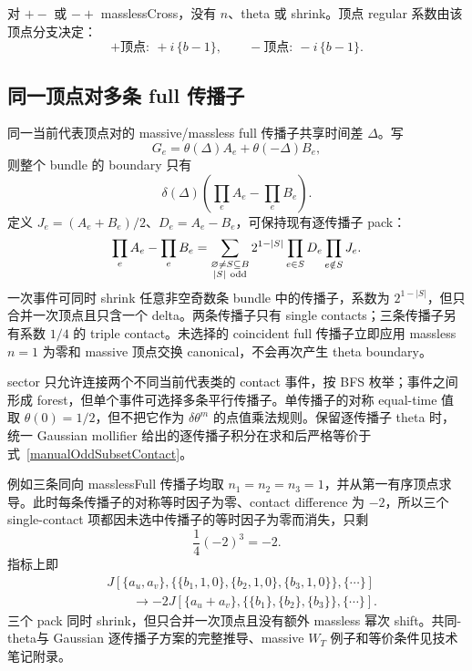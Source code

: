 ﻿\documentclass[a4paper,11pt]{article}
\begin{document}
对 $+-$ 或 $-+$ masslessCross，没有 $n$、theta 或 shrink。顶点 regular 系数由该顶点分支决定：
\begin{equation}
 +\text{顶点}:\ +i\,\{b-1\},
 \qquad
 -\text{顶点}:\ -i\,\{b-1\}.
\end{equation}

\subsection{同一顶点对多条 full 传播子}

同一当前代表顶点对的 massive/massless full 传播子共享时间差 $\Delta$。写
\begin{equation}
 G_e=\theta(\Delta)A_e+\theta(-\Delta)B_e,
\end{equation}
则整个 bundle 的 boundary 只有
\begin{equation}
 \delta(\Delta)\left(\prod_eA_e-\prod_eB_e\right).
\end{equation}
定义 $J_e=(A_e+B_e)/2$、$D_e=A_e-B_e$，可保持现有逐传播子 pack：
\begin{equation}
 \prod_eA_e-\prod_eB_e
 =\sum_{\substack{\varnothing\ne S\subseteq B\\|S|\ {\rm odd}}}
 2^{1-|S|}\prod_{e\in S}D_e\prod_{e\notin S}J_e.
 \label{manualOddSubsetContact}
\end{equation}
一次事件可同时 shrink 任意非空奇数条 bundle 中的传播子，系数为 $2^{1-|S|}$，但只合并一次顶点且只含一个 delta。两条传播子只有 single contacts；三条传播子另有系数 $1/4$ 的 triple contact。未选择的 coincident full 传播子立即应用 massless $n=1$ 为零和 massive 顶点交换 canonical，不会再次产生 theta boundary。

sector 只允许连接两个不同当前代表类的 contact 事件，按 BFS 枚举；事件之间形成 forest，但单个事件可选择多条平行传播子。单传播子的对称 equal-time 值取 $\theta(0)=1/2$，但不把它作为 $\delta\theta^m$ 的点值乘法规则。保留逐传播子 theta 时，统一 Gaussian mollifier 给出的逐传播子积分在求和后严格等价于式~\eqref{manualOddSubsetContact}。

例如三条同向 masslessFull 传播子均取 $n_1=n_2=n_3=1$，并从第一有序顶点求导。此时每条传播子的对称等时因子为零、contact difference 为 $-2$，所以三个 single-contact 项都因未选中传播子的等时因子为零而消失，只剩
\begin{equation}
 \frac14(-2)^3=-2.
\end{equation}
指标上即
\begin{align}
 &J[\{a_u,a_v\},
   \{\{b_1,1,0\},\{b_2,1,0\},\{b_3,1,0\}\},\{\cdots\}]
 \nonumber\\
 &\qquad\longrightarrow
 -2J[\{a_u+a_v\},\{\{b_1\},\{b_2\},\{b_3\}\},\{\cdots\}].
\end{align}
三个 pack 同时 shrink，但只合并一次顶点且没有额外 massless 幂次 shift。共同-theta与 Gaussian 逐传播子方案的完整推导、massive $W_T$ 例子和等价条件见技术笔记附录。
\end{document}
